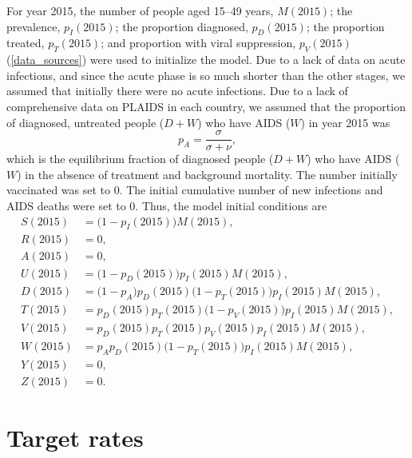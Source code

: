 \documentclass{article}
\begin{document}
For year 2015, the number of people aged 15--49 years, $M(2015)$; the
prevalence, $p_I(2015)$; the proportion diagnosed, $p_D(2015)$; the
proportion treated, $p_T(2015)$; and proportion with viral
suppression, $p_V(2015)$ (\autoref{data_sources}) were used to
initialize the model.  Due to a lack of data on acute infections, and
since the acute phase is so much shorter than the other stages, we
assumed that initially there were no acute infections.  Due to a lack
of comprehensive data on PLAIDS in each country, we assumed that the
proportion of diagnosed, untreated people ($D + W$) who have AIDS
($W$) in year 2015 was
\begin{equation}
  p_A = \frac{\sigma}{\sigma + \nu},
\end{equation}
which is the equilibrium fraction of diagnosed people ($D + W$) who
have AIDS ($W$) in the absence of treatment and background mortality.
The number initially vaccinated was set to 0.  The initial cumulative
number of new infections and AIDS deaths were set to 0.  Thus, the
model initial conditions are
\begin{equation}
  \label{initial_conditions}
  \begin{split}
    S(2015) &= \big(1 - p_I(2015)\big) M(2015), \\
    R(2015) &= 0, \\
    A(2015) &= 0, \\
    U(2015) &= \big(1 - p_D(2015)\big) p_I(2015) M(2015), \\
    D(2015) &= \big(1 - p_A\big) p_D(2015) \big(1 - p_T(2015)\big)
    p_I(2015) M(2015), \\
    T(2015) &= p_D(2015) p_T(2015) \big(1 - p_V(2015)\big)
    p_I(2015) M(2015), \\
    V(2015) &= p_D(2015) p_T(2015) p_V(2015) p_I(2015) M(2015), \\
    W(2015) &= p_A p_D(2015) \big(1 - p_T(2015)\big) p_I(2015) M(2015), \\
    Y(2015) &= 0, \\
    Z(2015) &= 0.
  \end{split}
\end{equation}


\section{Target rates}
\label{targets}
\end{document}
